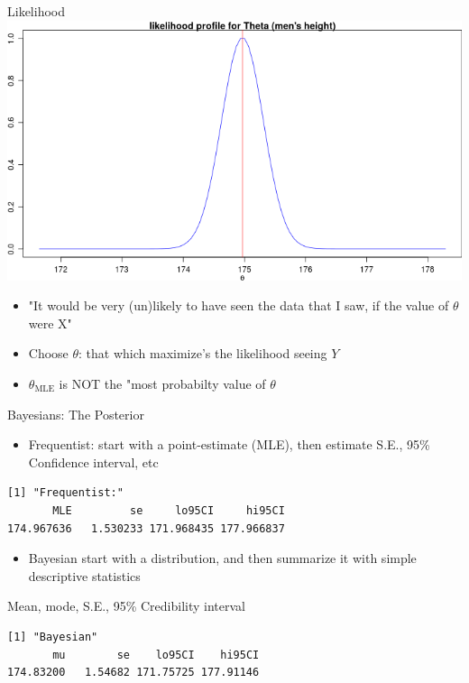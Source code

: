 \documentclass[presentation]{beamer}
\begin{document}
\begin{frame}[label=sec-9]{Likelihood}
\includegraphics[width=.9\linewidth]{loglike.png}

\begin{itemize}
\item "It would be very (un)likely to have seen the data that I saw, if the value of $\theta$ were X"
\item Choose $\theta$: that which maximize's the likelihood seeing $Y$
\item $\theta_\text{MLE}$ is NOT the "most probabilty value of $\theta$
\end{itemize}
\end{frame}
\begin{frame}[fragile,label=sec-10]{Bayesians: The Posterior}
 \begin{itemize}
\item Frequentist: start with a point-estimate (MLE), then estimate
S.E., 95\% Confidence interval, etc
\end{itemize}
\color{blue}
\begin{verbatim}
[1] "Frequentist:"
       MLE         se     lo95CI     hi95CI 
174.967636   1.530233 171.968435 177.966837
\end{verbatim}

\color{black}
\begin{itemize}
\item Bayesian start with a distribution, and then summarize it with simple descriptive statistics
\end{itemize}
Mean, mode, S.E., 95\% Credibility interval
\color{blue}
\begin{verbatim}
[1] "Bayesian"
       mu        se    lo95CI    hi95CI 
174.83200   1.54682 171.75725 177.91146
\end{verbatim}
\end{frame}
\end{document}
